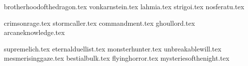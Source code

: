 

\bloodpowersintroduction

\raggedcolumns
\begin{multicols}{2}

\subtitle{\ancestralbloodpowers}

\startsortedpricelist

{brotherhoodofthedragon.tex}
{vonkarnstein.tex}
{lahmia.tex}
{strigoi.tex}
{nosferatu.tex}

\endsortedpricelist

\subtitle{\greaterbloodpowers}

\startsortedpricelist

{crimsonrage.tex}
{stormcaller.tex}
{commandment.tex}
{ghoullord.tex}
{arcaneknowledge.tex}

\endsortedpricelist

\subtitle{\lesserbloodpowers}

\startsortedpricelist

{supremelich.tex}
{eternalduellist.tex}
{monsterhunter.tex}
{unbreakablewill.tex}
{mesmerisinggaze.tex}
{bestialbulk.tex}
{flyinghorror.tex}
{mysteriesofthenight.tex}

\endsortedpricelist

\end{multicols}
